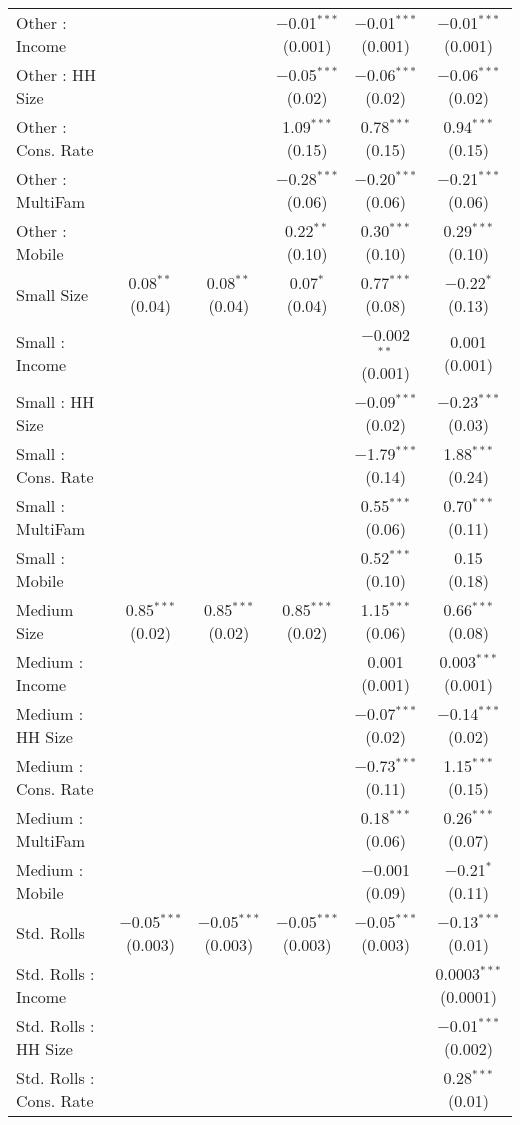 \begin{table}[!htbp]
\begin{tabular}{@{\extracolsep{5pt}}lccccc}
  Other : Income &  &  & $-$0.01$^{***}$ (0.001) & $-$0.01$^{***}$ (0.001) & $-$0.01$^{***}$ (0.001) \\ 
  Other : HH Size &  &  & $-$0.05$^{***}$ (0.02) & $-$0.06$^{***}$ (0.02) & $-$0.06$^{***}$ (0.02) \\ 
  Other : Cons. Rate &  &  & 1.09$^{***}$ (0.15) & 0.78$^{***}$ (0.15) & 0.94$^{***}$ (0.15) \\ 
  Other : MultiFam &  &  & $-$0.28$^{***}$ (0.06) & $-$0.20$^{***}$ (0.06) & $-$0.21$^{***}$ (0.06) \\ 
  Other : Mobile &  &  & 0.22$^{**}$ (0.10) & 0.30$^{***}$ (0.10) & 0.29$^{***}$ (0.10) \\ 
  Small Size & 0.08$^{**}$ (0.04) & 0.08$^{**}$ (0.04) & 0.07$^{*}$ (0.04) & 0.77$^{***}$ (0.08) & $-$0.22$^{*}$ (0.13) \\ 
  Small : Income &  &  &  & $-$0.002$^{**}$ (0.001) & 0.001 (0.001) \\ 
  Small : HH Size &  &  &  & $-$0.09$^{***}$ (0.02) & $-$0.23$^{***}$ (0.03) \\ 
  Small : Cons. Rate &  &  &  & $-$1.79$^{***}$ (0.14) & 1.88$^{***}$ (0.24) \\ 
  Small : MultiFam &  &  &  & 0.55$^{***}$ (0.06) & 0.70$^{***}$ (0.11) \\ 
  Small : Mobile &  &  &  & 0.52$^{***}$ (0.10) & 0.15 (0.18) \\ 
  Medium Size & 0.85$^{***}$ (0.02) & 0.85$^{***}$ (0.02) & 0.85$^{***}$ (0.02) & 1.15$^{***}$ (0.06) & 0.66$^{***}$ (0.08) \\ 
  Medium : Income &  &  &  & 0.001 (0.001) & 0.003$^{***}$ (0.001) \\ 
  Medium : HH Size &  &  &  & $-$0.07$^{***}$ (0.02) & $-$0.14$^{***}$ (0.02) \\ 
  Medium : Cons. Rate &  &  &  & $-$0.73$^{***}$ (0.11) & 1.15$^{***}$ (0.15) \\ 
  Medium : MultiFam &  &  &  & 0.18$^{***}$ (0.06) & 0.26$^{***}$ (0.07) \\ 
  Medium : Mobile &  &  &  & $-$0.001 (0.09) & $-$0.21$^{*}$ (0.11) \\ 
  Std. Rolls & $-$0.05$^{***}$ (0.003) & $-$0.05$^{***}$ (0.003) & $-$0.05$^{***}$ (0.003) & $-$0.05$^{***}$ (0.003) & $-$0.13$^{***}$ (0.01) \\ 
  Std. Rolls : Income &  &  &  &  & 0.0003$^{***}$ (0.0001) \\ 
  Std. Rolls : HH Size &  &  &  &  & $-$0.01$^{***}$ (0.002) \\ 
  Std. Rolls : Cons. Rate &  &  &  &  & 0.28$^{***}$ (0.01) \\ 

\end{tabular}
\end{table}

